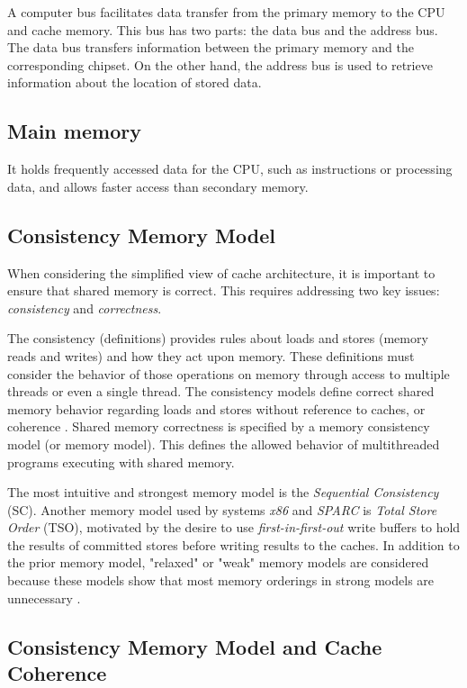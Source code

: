 A computer bus facilitates data transfer from the primary memory to the CPU and cache memory. This bus has two parts: the data bus and the address bus. The data bus transfers information between the primary memory and the corresponding chipset. On the other hand, the address bus is used to retrieve information about the location of stored data.

\subsection{Main memory}
\label{sec:orgf1a7f27}

It holds frequently accessed data for the CPU, such as instructions or processing data, and allows faster access than secondary memory.

\subsection{Consistency Memory Model}

When considering the simplified view of cache architecture, it is important to ensure that shared memory is correct. This requires addressing two key issues: \emph{consistency} and \emph{correctness}.

The consistency (definitions) provides rules about loads and stores (memory
reads and writes) and how they act upon memory. These definitions must consider the behavior of those operations on memory through access to
multiple threads or even a single thread. The consistency models define
correct shared memory behavior regarding loads and stores without
reference to caches, or coherence \cite{DBLP_series_synthesis_2020Nagarajan}.
Shared memory correctness is specified by a memory consistency model (or
memory model). This defines the allowed behavior of multithreaded programs
executing with shared memory.

The most intuitive and strongest memory model is the \emph{Sequential Consistency}
(SC). Another memory model used by systems \emph{x86} and \emph{SPARC} is \emph{Total Store Order}
(TSO), motivated by the desire to use \emph{first-in-first-out} write buffers to
hold the results of committed stores before writing results to the caches.
In addition to the prior memory model, "relaxed" or "weak" memory models are
considered because these models show that most memory orderings in strong
models are unnecessary \cite{DBLP_series_synthesis_2020Nagarajan}.

\subsection{Consistency Memory Model and Cache Coherence}
\label{sec:orge62077c}

